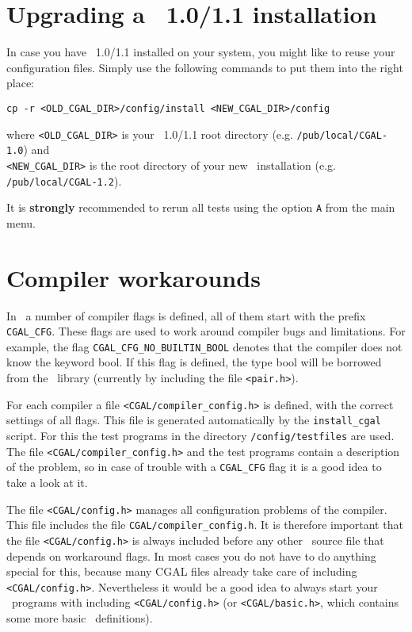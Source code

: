 \section{Upgrading a \cgal\ 1.0/1.1 installation}
In case you have \cgal\ 1.0/1.1 installed on your system, you might
like to reuse your configuration files. Simply use the following
commands to put them into the right place:
\begin{verbatim}
cp -r <OLD_CGAL_DIR>/config/install <NEW_CGAL_DIR>/config
\end{verbatim}
where \texttt{<OLD\_CGAL\_DIR>} is your \cgal\ 1.0/1.1 root directory
(e.g.  \texttt{/pub/local/CGAL-1.0}) and\\
\texttt{<NEW\_CGAL\_DIR>} is the root directory of your new \cgal\ 
installation (e.g. {\tt /pub/local/CGAL-1.2}).

It is \textbf{strongly} recommended to rerun all tests using the
option \texttt{A} from the main menu.

\section{Compiler workarounds}
In \cgal\ a number of compiler flags is defined, all of them start
with the prefix \texttt{CGAL\_CFG}. These flags are used to work
around compiler bugs and limitations.  For example, the flag
\texttt{CGAL\_CFG\_NO\_BUILTIN\_BOOL} denotes that the compiler does
not know the keyword bool. If this flag is defined, the type bool will
be borrowed from the \stl\ library (currently by including the file
\texttt{<pair.h>}).

For each compiler a file \texttt{<CGAL/compiler\_config.h>} is
defined, with the correct settings of all flags. This file is
generated automatically by the \texttt{install\_cgal} script. For this
the test programs in the directory \texttt{\cgaldir/config/testfiles}
are used. The file \texttt{<CGAL/compiler\_config.h>} and the test
programs contain a description of the problem, so in case of trouble
with a \texttt{CGAL\_CFG} flag it is a good idea to take a look at it.

The file \texttt{<CGAL/config.h>} manages all configuration problems
of the compiler.  This file includes the file
\texttt{CGAL/compiler\_config.h}.  It is therefore important that the
file \texttt{<CGAL/config.h>} is always included before any other
\cgal\ source file that depends on workaround flags. In most cases you
do not have to do anything special for this, because many CGAL files
already take care of including \texttt{<CGAL/config.h>}. Nevertheless
it would be a good idea to always start your \cgal\ programs with
including \texttt{<CGAL/config.h>} (or \texttt{<CGAL/basic.h>}, which
contains some more basic \cgal\ definitions).

